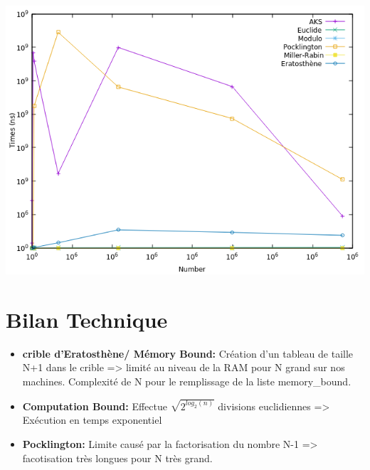 		\begin{frame}
		\begin{center}\includegraphics[scale=0.6]{result.png}\end{center}
		\end{frame}
		
	\section{Bilan Technique}
		\begin{frame}
			\begin{itemize}
			\item \textbf{crible d'Eratosthène/ Mémory Bound:} Création d'un tableau de taille N+1 dans le crible => limité au niveau de la RAM pour N grand sur nos machines. Complexité de N pour le remplissage de la liste memory\_bound. \\
			\vspace{1em}			
			\item \textbf{Computation Bound:} Effectue $\sqrt{2^{log_2(n)}}$ divisions euclidiennes => Exécution en temps exponentiel\\
			\vspace{1em}
			\item \textbf{Pocklington:} Limite causé par la factorisation du nombre N-1 => facotisation très longues pour N très grand.\\
			\vspace{1em}
			
			\end{itemize}	
			\end{frame}
			
